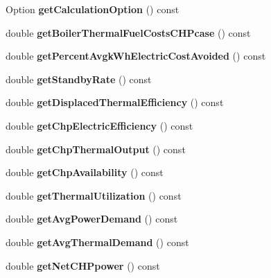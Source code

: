 \begin{DoxyCompactItemize}
Option {\bfseries get\+Calculation\+Option} () const
\item 
\mbox{\label{class_c_h_p_ace1d96aacf328bd62f01e0eceaae19f6}} 
double {\bfseries get\+Boiler\+Thermal\+Fuel\+Costs\+C\+H\+Pcase} () const
\item 
\mbox{\label{class_c_h_p_ad79607b304d1e50a9421de043b7a9e7b}} 
double {\bfseries get\+Percent\+Avgk\+Wh\+Electric\+Cost\+Avoided} () const
\item 
\mbox{\label{class_c_h_p_a195f0ffe163404077b56a5e5db8eb59c}} 
double {\bfseries get\+Standby\+Rate} () const
\item 
\mbox{\label{class_c_h_p_a66b1b0e6a0d7f3181b3c1dfb590ab523}} 
double {\bfseries get\+Displaced\+Thermal\+Efficiency} () const
\item 
\mbox{\label{class_c_h_p_a1d38e08a7815211361d334263832cad6}} 
double {\bfseries get\+Chp\+Electric\+Efficiency} () const
\item 
\mbox{\label{class_c_h_p_a13e271f59d6315088416123c6e794e09}} 
double {\bfseries get\+Chp\+Thermal\+Output} () const
\item 
\mbox{\label{class_c_h_p_abd1ea13cd48f5af48799891a52634340}} 
double {\bfseries get\+Chp\+Availability} () const
\item 
\mbox{\label{class_c_h_p_aa27fd9e66e208e6b3f28fdfe182d6c32}} 
double {\bfseries get\+Thermal\+Utilization} () const
\item 
\mbox{\label{class_c_h_p_a79f9a97a010669c5ffed9339c54a36c6}} 
double {\bfseries get\+Avg\+Power\+Demand} () const
\item 
\mbox{\label{class_c_h_p_a5f8975488324e4aa3517c9e01334f4bf}} 
double {\bfseries get\+Avg\+Thermal\+Demand} () const
\item 
\mbox{\label{class_c_h_p_a317f3df613b61f401bc5c4b69fddd0cf}} 
double {\bfseries get\+Net\+C\+H\+Ppower} () const
\item 
\mbox{\label{class_c_h_p_a1b9d3ba01f7e243bcde31bd5fdff9e0a}} 

\end{DoxyCompactItemize}

